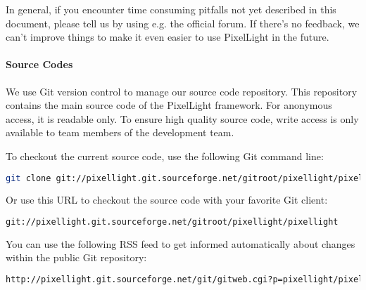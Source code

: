 In general, if you encounter time consuming pitfalls not yet described in this document, please tell us by using e.g. the official forum. If there's no feedback, we can't improve things to make it even easier to use PixelLight in the future.


\paragraph{Source Codes}
We use Git version control to manage our source code repository. This repository contains the main source code of the PixelLight framework. For anonymous access, it is readable only. To ensure high quality source code, write access is only available to team members of the development team.

To checkout the current source code, use the following Git command line:
\begin{lstlisting}[language=sh]
git clone git://pixellight.git.sourceforge.net/gitroot/pixellight/pixellight
\end{lstlisting}

Or use this \ac{URL} to checkout the source code with your favorite Git client:
\begin{lstlisting}[language=sh]
git://pixellight.git.sourceforge.net/gitroot/pixellight/pixellight
\end{lstlisting}

You can use the following RSS feed to get informed automatically about changes within the public Git repository:
\begin{lstlisting}[language=sh]
http://pixellight.git.sourceforge.net/git/gitweb.cgi?p=pixellight/pixellight;a=rss
\end{lstlisting}
